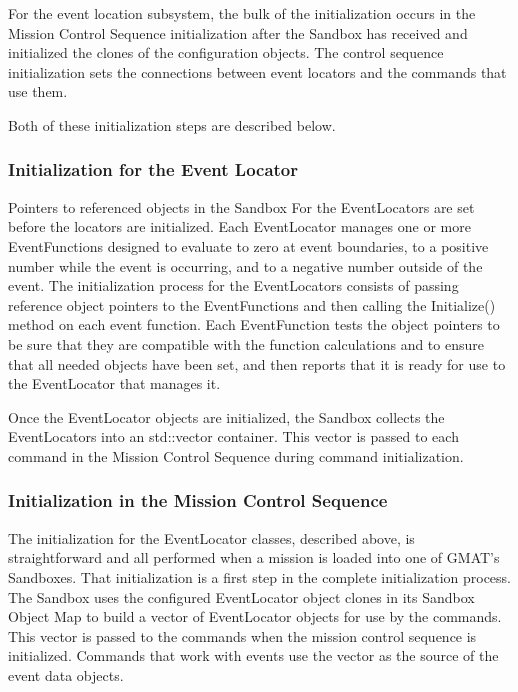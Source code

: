 \documentclass[letterpaper,10pt]{article}
\begin{document}
For the event location subsystem, the bulk of the initialization occurs in the
Mission Control Sequence initialization after the Sandbox has received and
initialized the clones of the configuration objects.  The control sequence
initialization sets the connections between event locators and the commands
that use them.  

Both of these initialization steps are described below.

\subsubsection{Initialization for the Event Locator}

Pointers to referenced objects in the Sandbox For the EventLocators are set
before the locators are initialized. Each EventLocator manages one or more
EventFunctions designed to evaluate to zero at event boundaries, to a positive
number while the event is occurring, and to a negative number outside of the
event.  The initialization process for the EventLocators consists of passing
reference object pointers to the EventFunctions and then calling the
Initialize() method on each event function.  Each EventFunction tests the object
pointers to be sure that they are compatible with the function calculations and
to ensure that all needed objects have been set, and then reports that it is
ready for use to the EventLocator that manages it.

Once the EventLocator objects are initialized, the Sandbox collects the
EventLocators into an std::vector container.  This vector is passed to each
command in the Mission Control Sequence during command initialization.

\subsubsection{Initialization in the Mission Control Sequence}

The initialization for the EventLocator classes, described above, is
straightforward and all performed when a mission is loaded into one of GMAT's
Sandboxes.  That initialization is a first step in the complete initialization
process.  The Sandbox uses the configured EventLocator object clones in its
Sandbox Object Map to build a vector of EventLocator objects for use by the
commands.  This vector is passed to the commands when the mission control
sequence is initialized.  Commands that work with events use the vector as the
source of the event data objects.  
\end{document}

